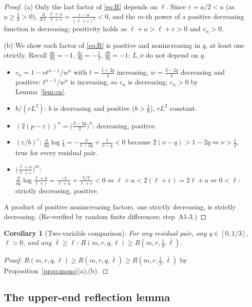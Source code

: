 \documentclass[11pt]{article}
\newtheorem{corollary}[theorem]{Corollary}
\theoremstyle{remark}
\theoremstyle{plain}
\theoremstyle{plain}
\newcommand{\lbar}{\bar\ell}
\begin{document}
\begin{proof}
(a) Only the last factor of \eqref{eq:R} depends on $\ell$.  Since $\varepsilon=a/2<a$ (as $a\ge\tfrac16>0$),
$\frac{d}{d\ell}\,\frac{\ell+a}{\ell+\varepsilon}=\frac{\varepsilon-a}{(\ell+\varepsilon)^{2}}<0$,
and the $m$-th power of a positive decreasing function is decreasing; positivity holds as $\ell+a>\ell+\varepsilon>0$ and $c_n>0$.

(b) We show each factor of \eqref{eq:R} is positive and nonincreasing in $q$, at least one strictly.  Recall $\tfrac{da}{dq}=-1$, $\tfrac{d\varepsilon}{dq}=-\tfrac12$, $\tfrac{db}{dq}=-1$; $L,\nu$ do not depend on $q$.
\begin{itemize}
\item $c_n=1-\nu t^{n-1}/w^{n}$ with $t=\frac{1+2q}{4}$ increasing, $w=\frac{3-2q}{4}$ decreasing and positive: $t^{n-1}/w^{n}$ is increasing, so $c_n$ is decreasing; $c_n>0$ by Lemma~\ref{lem:cn}.
\item $b/(rL^{2})$: $b$ is decreasing and positive ($b>\tfrac16$), $rL^{2}$ constant.
\item $(2(p-\varepsilon))^{n}=\bigl(\tfrac{3-2q}{2}\bigr)^{n}$: decreasing, positive.
\item $(\varepsilon/b)^{r}$: $\frac{d}{dq}\log\frac{\varepsilon}{b}=-\frac{2}{1-2q}+\frac{1}{\nu-q}<0$ because $2(\nu-q)>1-2q\iff\nu>\tfrac12$, true for every residual pair.
\item $\bigl(\frac{\ell+a}{\ell+\varepsilon}\bigr)^{m}$:
$\frac{d}{dq}\log\frac{\ell+a}{\ell+\varepsilon}
=\frac{-1}{\ell+a}+\frac{1/2}{\ell+\varepsilon}<0
\iff\ell+a<2(\ell+\varepsilon)=2\ell+a\iff0<\ell$: strictly decreasing, positive.
\end{itemize}
A product of positive nonincreasing factors, one strictly decreasing, is strictly decreasing.  (Re-verified by random finite differences; step~A1-3.)
\end{proof}

\begin{corollary}[Two-variable comparison]\label{cor:twovar}
For any residual pair, any $q\in[0,1/3]$, $\ell>0$, and any $\lbar\ge\ell$:
$R(m,r,q,\ell)\ge R(m,r,\tfrac13,\lbar)$.
\end{corollary}

\begin{proof}
$R(m,r,q,\ell)\ge R(m,r,q,\lbar)\ge R(m,r,\tfrac13,\lbar)$ by Proposition~\ref{prop:mono}(a),(b).
\end{proof}

\subsection{The upper-end reflection lemma}\label{sec:reflection}
\end{document}
